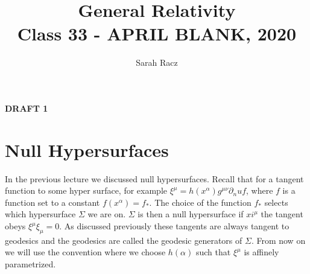 \documentclass[10pt]{article}
\title{{\Huge General Relativity}\\{\Large{Class  33 - APRIL BLANK, 2020}}} %
\author{Sarah Racz}
\begin{document}
    \maketitle
    \flushbottom
    \newpage
    \pagestyle{fancynotes}
	
	\textbf{DRAFT 1 }
	
	\section{Null Hypersurfaces}
	In the previous lecture we discussed null hypersurfaces. Recall that for a tangent function to some hyper surface, for example $\xi^\mu = h(x^\alpha) g^{\mu \nu} \partial_nu f$, where $f$ is a function set to a constant $f(x^\alpha) = f_*$. The choice of the function $f_*$ selects which hypersurface $\Sigma$ we are on. $\Sigma$ is then a null hypersurface if $xi^\mu$  the tangent obeys  $\xi^\mu \xi_\mu = 0$. As discussed previously these tangents are always tangent to geodesics and the geodesics are called the geodesic generators of $\Sigma$. From now on we will use the convention where we choose $h(\alpha)$ such that $\xi^\mu$ is affinely parametrized. 
	
\end{document}
